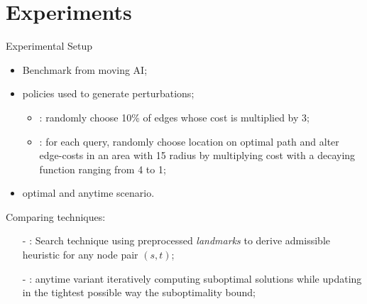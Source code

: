 \section*{Experiments}

\begin{frame}{Experimental Setup}
    
    \begin{itemize}
        \item Benchmark from moving AI;
        \item policies used to generate perturbations;
            \begin{itemize}
                \item {}: randomly choose 10\% of edges whose cost is multiplied by 3;
                \item {}: for each query, randomly choose location on optimal path and alter edge-costs in an area with 15 radius by multiplying cost with a decaying function ranging from 4 to 1;
            \end{itemize}
        \item optimal and anytime scenario.
    \end{itemize}
    Comparing techniques:
    \begin{itemize}
        \item[-] \ALT{}: Search technique using preprocessed \textit{landmarks} to derive admissible heuristic for any node pair $(s, t)$;
        \item[-] \AWA{}: \WA{} anytime variant iteratively computing suboptimal solutions while updating in the tightest possible way the suboptimality bound;
    \end{itemize}
\end{frame}

